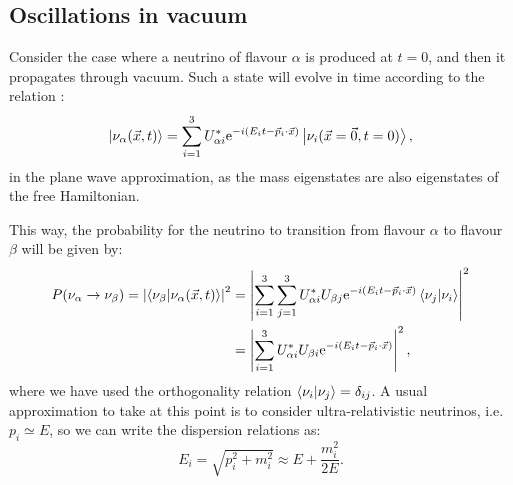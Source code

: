 \subsection{Oscillations in vacuum}

Consider the case where a neutrino of flavour $\alpha$ is produced at $t=0$, and then it propagates through vacuum. Such a state will evolve in time according to the relation \cite{Giganti2017}:
\begin{equation}
\ket{\nu_{\alpha}(\vec{x}, t)} = \sum_{i=1}^{3} U^{*}_{\alpha i} \mathrm{e}^{-i(E_{i}t-\vec{p}_{i}\cdot\vec{x})} \ket{\nu_{i}(\vec{x}=\vec{0},t=0)},
\end{equation}
in the plane wave approximation, as the mass eigenstates are also eigenstates of the free Hamiltonian.

This way, the probability for the neutrino to transition from flavour $\alpha$ to flavour $\beta$ will be given by:
\begin{equation}
\begin{split}
	P(\nu_{\alpha} \rightarrow \nu_{\beta}) = \left|\braket{\nu_{\beta}}{\nu_{\alpha}(\vec{x}, t)}\right|^{2} &= \left|\sum_{i=1}^{3} \sum_{j=1}^{3} U^{*}_{\alpha i} U_{\beta j} \mathrm{e}^{-i(E_{i}t-\vec{p}_{i}\cdot\vec{x})} \braket{\nu_{j}}{\nu_{i}}\right|^{2}\\
	&= \left|\sum_{i=1}^{3} U^{*}_{\alpha i} U_{\beta i} \mathrm{e}^{-i(E_{i}t-\vec{p}_{i}\cdot\vec{x})}\right|^{2},
\end{split}
\end{equation}
where we have used the orthogonality relation $\braket{\nu_{i}}{\nu_{j}} = \delta_{ij}$. A usual approximation to take at this point is to consider ultra-relativistic neutrinos, i.e. $p_{i} \simeq E$, so we can write the dispersion relations as:
\begin{equation}
E_{i} = \sqrt{p_{i}^{2} + m_{i}^{2}} \approx E + \frac{m_{i}^{2}}{2 E}.
\end{equation}

